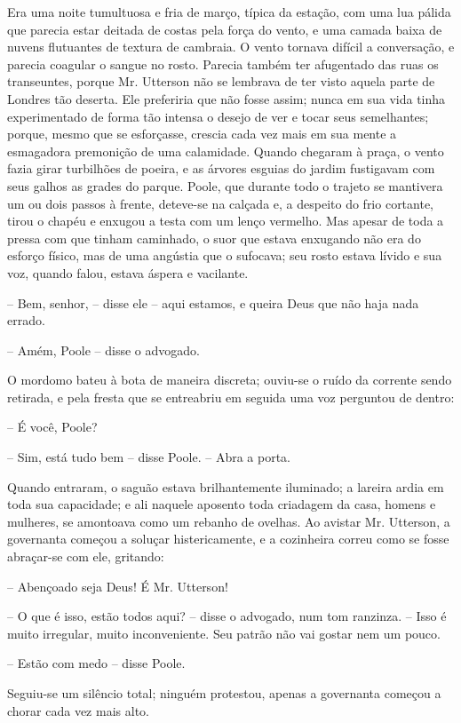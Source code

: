Era uma noite tumultuosa e fria de março, típica da estação, com uma lua
pálida que parecia estar deitada de costas pela força do vento, e uma
camada baixa de nuvens flutuantes de textura de cambraia.  O vento
tornava difícil a conversação, e parecia coagular o sangue no rosto. 
Parecia também ter afugentado das ruas os transeuntes, porque Mr.
Utterson não se lembrava de ter visto aquela parte de Londres tão
deserta.  Ele preferiria que não fosse assim; nunca em sua vida tinha
experimentado de forma tão intensa o desejo de ver e tocar seus
semelhantes; porque, mesmo que se esforçasse, crescia cada vez mais
em sua mente a esmagadora premonição de uma calamidade.  Quando
chegaram à praça, o vento fazia girar turbilhões de poeira, e as
árvores esguias do jardim fustigavam com seus galhos as grades do
parque.  Poole, que durante todo o trajeto se mantivera um ou dois
passos à frente, deteve-se na calçada e, a despeito do frio cortante,
tirou o chapéu e enxugou a testa com um lenço vermelho.  Mas apesar de
toda a pressa com que tinham caminhado, o suor que estava enxugando não
era do esforço físico, mas de uma angústia que o sufocava; seu rosto
estava lívido e sua voz, quando falou, estava áspera e vacilante.

-- Bem, senhor, -- disse ele -- aqui estamos, e queira Deus que não haja
nada errado.

-- Amém, Poole -- disse o advogado.

O mordomo bateu à bota de maneira discreta; ouviu-se o ruído da corrente
sendo retirada, e pela fresta que se entreabriu em seguida uma voz
perguntou de dentro:

-- É você, Poole? 

-- Sim, está tudo bem -- disse Poole. -- Abra a porta.

Quando entraram, o saguão estava brilhantemente iluminado; a lareira
ardia em toda sua capacidade; e ali naquele aposento toda criadagem da
casa, homens e mulheres, se amontoava como um rebanho de ovelhas.  Ao
avistar Mr. Utterson, a governanta começou a soluçar histericamente, e
a cozinheira correu como se fosse abraçar-se com ele, gritando:

-- Abençoado seja Deus!  É Mr. Utterson!

-- O que é isso, estão todos aqui? -- disse o advogado, num tom
ranzinza. -- Isso é muito irregular, muito inconveniente. Seu patrão
não vai gostar nem um pouco.

-- Estão com medo -- disse Poole.

Seguiu-se um silêncio total; ninguém protestou, apenas a governanta
começou a chorar cada vez mais alto.

